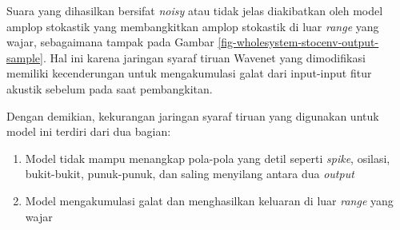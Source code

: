Suara yang dihasilkan bersifat \textit{noisy} atau tidak jelas diakibatkan oleh model amplop stokastik yang membangkitkan amplop stokastik di luar \textit{range} yang wajar, sebagaimana tampak pada Gambar \ref{fig-wholesystem-stocenv-output-sample}. Hal ini karena jaringan syaraf tiruan Wavenet yang dimodifikasi memiliki kecenderungan untuk mengakumulasi galat dari input-input fitur akustik sebelum pada saat pembangkitan.

Dengan demikian, kekurangan jaringan syaraf tiruan yang digunakan untuk model ini terdiri dari dua bagian:
\begin{enumerate}
	\item Model tidak mampu menangkap pola-pola yang detil seperti \textit{spike}, osilasi, bukit-bukit, punuk-punuk, dan saling menyilang antara dua \textit{output}
	\item Model mengakumulasi galat dan menghasilkan keluaran di luar \textit{range} yang wajar
\end{enumerate}

